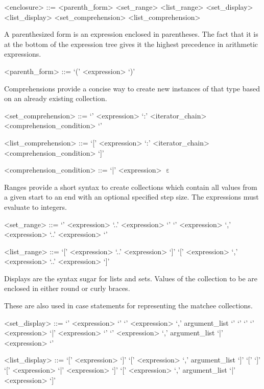 \begin{grammar}
<enclosure> ::= <parenth_form>
\alt <set_range>
\alt <list_range>
\alt <set_display>
\alt <list_display>
\alt <set_comprehension>
\alt <list_comprehension>
\end{grammar}

%

A parenthesized form is an expression enclosed in parentheses. The fact that it is at the bottom of the expression tree gives it the highest precedence in arithmetic expressions.

\begin{grammar}
<parenth_form> ::= `(' <expression> `)'
\end{grammar}

%

Comprehensions provide a concise way to create new instances of that type based on an already existing collection.

\begin{grammar}
<set_comprehension> ::= `{' <expression> `:' <iterator_chain> <comprehension_condition> `}'

<list_comprehension> ::= `[' <expression> `:' <iterator_chain> <comprehension_condition> `]'

<comprehension_condition> ::= `|' <expression>
\alt $\upepsilon$
\end{grammar}

%

Ranges provide a short syntax to create collections which contain all values from a given start to an end with an optional specified step size. The expressions must evaluate to integers.

\begin{grammar}
<set_range> ::= `{' <expression> `..' <expression> `}'
\alt `{' <expression> `,' <expression> `..' <expression> `}'

<list_range> ::= `[' <expression> `..' <expression> `]'
\alt `[' <expression> `,' <expression> `..' <expression> `]'
\end{grammar}

%

Displays are the syntax sugar for lists and sets. Values of the collection to be are enclosed in either round or curly braces. 

These are also used in case statements for representing the matchee collections.

\begin{grammar}
<set_display> ::= `{' <expression> `}'
\alt `{' <expression> `,' argument_list `}'
\alt `{' `}'
\alt `{' <expression> `|' <expression> `}'
\alt `{' <expression> `,' argument_list `|' <expression> `}'

<list_display> ::= `[' <expression> `]'
\alt `[' <expression> `,' argument_list `]'
\alt `[' `]'
\alt `[' <expression> `|' <expression> `]'
\alt `[' <expression> `,' argument_list `|' <expression> `]'
\end{grammar}

